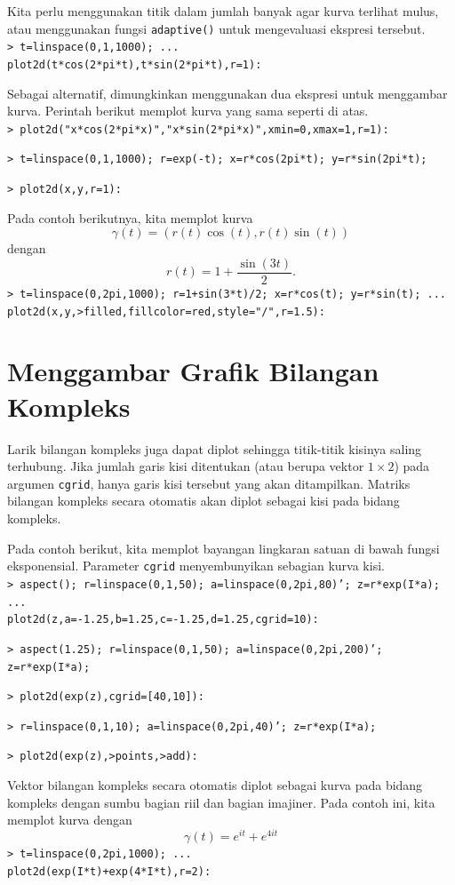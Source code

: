 \documentclass[11pt, a4paper]{article}
\newcommand{\emtcmd}[1]{\noindent\texttt{\textcolor{emtcommand}{>}\ #1}\par\smallskip}
\begin{document}
Kita perlu menggunakan titik dalam jumlah banyak agar kurva terlihat mulus, atau menggunakan fungsi \texttt{adaptive()} untuk mengevaluasi ekspresi tersebut.
\emtcmd{t=linspace(0,1,1000); ... \\
\hspace*{1em} plot2d(t*cos(2*pi*t),t*sin(2*pi*t),r=1):}

Sebagai alternatif, dimungkinkan menggunakan dua ekspresi untuk menggambar kurva. Perintah berikut memplot kurva yang sama seperti di atas.
\emtcmd{plot2d("x*cos(2*pi*x)","x*sin(2*pi*x)",xmin=0,xmax=1,r=1):}
\emtcmd{t=linspace(0,1,1000); r=exp(-t); x=r*cos(2pi*t); y=r*sin(2pi*t);}
\emtcmd{plot2d(x,y,r=1):}

Pada contoh berikutnya, kita memplot kurva
$$\gamma(t) = (r(t) \cos(t), r(t) \sin(t))$$
dengan
$$r(t) = 1 + \frac{\sin(3t)}{2}.$$
\emtcmd{t=linspace(0,2pi,1000); r=1+sin(3*t)/2; x=r*cos(t); y=r*sin(t); ... \\
\hspace*{1em} plot2d(x,y,>filled,fillcolor=red,style="/",r=1.5):}

\section*{Menggambar Grafik Bilangan Kompleks}

Larik bilangan kompleks juga dapat diplot sehingga titik-titik kisinya saling terhubung. Jika jumlah garis kisi ditentukan (atau berupa vektor $1 \times 2$) pada argumen \texttt{cgrid}, hanya garis kisi tersebut yang akan ditampilkan. Matriks bilangan kompleks secara otomatis akan diplot sebagai kisi pada bidang kompleks.

Pada contoh berikut, kita memplot bayangan lingkaran satuan di bawah fungsi eksponensial. Parameter \texttt{cgrid} menyembunyikan sebagian kurva kisi.
\emtcmd{aspect(); r=linspace(0,1,50); a=linspace(0,2pi,80)'; z=r*exp(I*a); ... \\
\hspace*{1em} plot2d(z,a=-1.25,b=1.25,c=-1.25,d=1.25,cgrid=10):}
\emtcmd{aspect(1.25); r=linspace(0,1,50); a=linspace(0,2pi,200)'; z=r*exp(I*a);}
\emtcmd{plot2d(exp(z),cgrid=[40,10]):}
\emtcmd{r=linspace(0,1,10); a=linspace(0,2pi,40)'; z=r*exp(I*a);}
\emtcmd{plot2d(exp(z),>points,>add):}

Vektor bilangan kompleks secara otomatis diplot sebagai kurva pada bidang kompleks dengan sumbu bagian riil dan bagian imajiner. Pada contoh ini, kita memplot kurva dengan
$$\gamma(t) = e^{it} + e^{4it}$$
\emtcmd{t=linspace(0,2pi,1000); ... \\
\hspace*{1em} plot2d(exp(I*t)+exp(4*I*t),r=2):}
\end{document}

